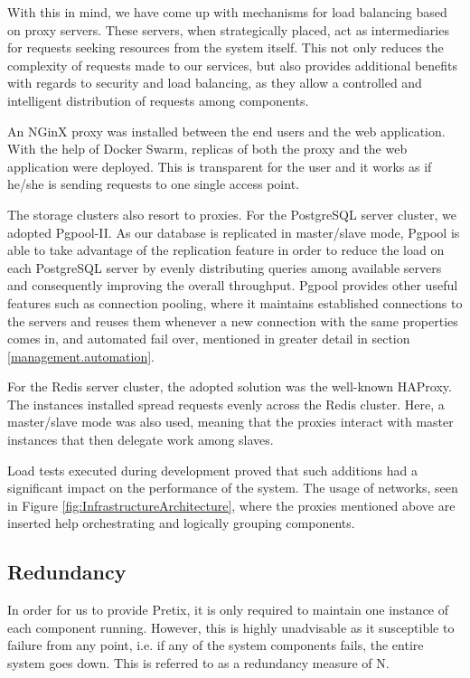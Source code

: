 \documentclass[12pt]{article}
\begin{document}
With this in mind, we have come up with mechanisms for load balancing based on proxy servers.
These servers, when strategically placed, act as intermediaries for requests seeking resources from the system itself.
This not only reduces the complexity of requests made to our services, but also provides additional benefits with regards to security and load balancing,
as they allow a controlled and intelligent distribution of requests among components.

An NGinX proxy was installed between the end users and the web application.
With the help of Docker Swarm, replicas of both the proxy and the web application were deployed.
This is transparent for the user and it works as if he/she is sending requests to one single access point.

The storage clusters also resort to proxies.
For the PostgreSQL server cluster, we adopted Pgpool-II.
As our database is replicated in master/slave mode, Pgpool is able to take advantage of the replication feature in order to reduce the load on each PostgreSQL server
by evenly distributing queries among available servers and consequently improving the overall throughput.
Pgpool provides other useful features such as connection pooling, where it maintains established connections to the servers and reuses them whenever a new 
connection with the same properties comes in, and automated fail over, mentioned in greater detail in section \ref{management.automation}.

For the Redis server cluster, the adopted solution was the well-known HAProxy.
The instances installed spread requests evenly across the Redis cluster.
Here, a master/slave mode was also used, meaning that the proxies interact with master instances that then delegate work among slaves.

Load tests executed during development proved that such additions had a significant impact on the performance of the system.
The usage of networks, seen in Figure \ref{fig:InfrastructureArchitecture}, where the proxies mentioned above are inserted help orchestrating and logically 
grouping components.

\subsection{Redundancy} \label{architecture.redundancy} %


In order for us to provide Pretix, it is only required to maintain one instance of each component running.
However, this is highly unadvisable as it susceptible to failure from any point, i.e. if any of the system components fails, the entire system goes down.
This is referred to as a redundancy measure of N.
\end{document}
